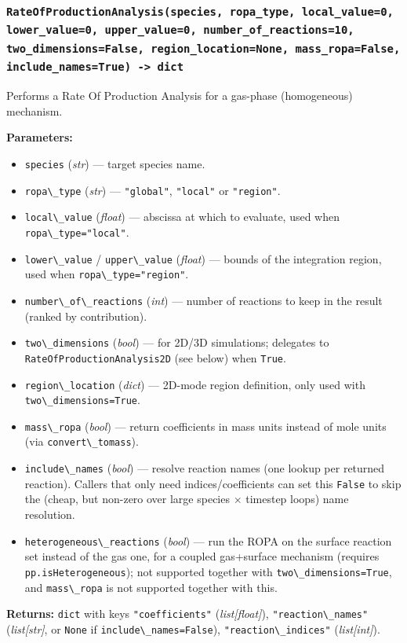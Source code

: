 \documentclass[11pt,a4paper]{report}
\newcommand{\pymethod}[1]{\subsubsection{\texttt{#1}}}
\newcommand{\returns}{\vspace{2mm}\noindent\textbf{Returns:} }
\newenvironment{params}{\vspace{1mm}\noindent\textbf{Parameters:}\begin{itemize}[leftmargin=1.1cm,label={--},itemsep=1pt,topsep=2pt]}{\end{itemize}}
\newcommand{\pkg}[1]{\lstinline|#1|}
\begin{document}
\pymethod{RateOfProductionAnalysis(species, ropa\_type, local\_value=0, lower\_value=0, upper\_value=0, number\_of\_reactions=10, two\_dimensions=False, region\_location=None, mass\_ropa=False, include\_names=True) -> dict}

Performs a Rate Of Production Analysis for a gas-phase (homogeneous)
mechanism.

\begin{params}
\item \pkg{species} (\textit{str}) --- target species name.
\item \pkg{ropa\_type} (\textit{str}) --- \pkg{"global"}, \pkg{"local"} or
  \pkg{"region"}.
\item \pkg{local\_value} (\textit{float}) --- abscissa at which to evaluate,
  used when \pkg{ropa\_type="local"}.
\item \pkg{lower\_value} / \pkg{upper\_value} (\textit{float}) --- bounds of
  the integration region, used when \pkg{ropa\_type="region"}.
\item \pkg{number\_of\_reactions} (\textit{int}) --- number of reactions to
  keep in the result (ranked by contribution).
\item \pkg{two\_dimensions} (\textit{bool}) --- for 2D/3D simulations;
  delegates to \pkg{RateOfProductionAnalysis2D} (see below) when \pkg{True}.
\item \pkg{region\_location} (\textit{dict}) --- 2D-mode region definition,
  only used with \pkg{two\_dimensions=True}.
\item \pkg{mass\_ropa} (\textit{bool}) --- return coefficients in mass units
  instead of mole units (via \pkg{convert\_tomass}).
\item \pkg{include\_names} (\textit{bool}) --- resolve reaction names (one
  lookup per returned reaction). Callers that only need indices/coefficients
  can set this \pkg{False} to skip the (cheap, but non-zero over large
  species $\times$ timestep loops) name resolution.
\item \pkg{heterogeneous\_reactions} (\textit{bool}) --- run the ROPA on the
  surface reaction set instead of the gas one, for a coupled gas+surface
  mechanism (requires \pkg{pp.isHeterogeneous}); not supported together with
  \pkg{two\_dimensions=True}, and \pkg{mass\_ropa} is not supported together
  with this.
\end{params}
\returns \pkg{dict} with keys \pkg{"coefficients"} (\textit{list[float]}),
\pkg{"reaction\_names"} (\textit{list[str]}, or \pkg{None} if
\pkg{include\_names=False}), \pkg{"reaction\_indices"} (\textit{list[int]}).
\end{document}
